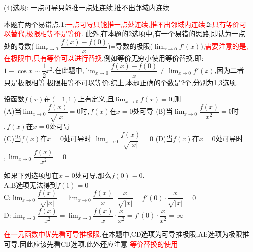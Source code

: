 \documentclass[8pt a4paper, oneside, UTF8]{ctexbook}  %
\begin{document}
\begin{sloppypar}
\begin{solution}
        (4)选项: 一点可导只能推一点处连续,推不出邻域内连续
    \end{solution}
    \begin{note}
        本题有两个易错点,1:\textcolor{red}{一点可导只能推一点处连续,推不出邻域内连续.}2:\textcolor{red}{只有等价可以替代,极限相等不是等价}.\newline
        此外,在本题的2选项中,有一个易错的思路,即认为一点处的导数($\lim_{x\to 0}\dfrac{f(x)-f(0)}{x}$)=导数的极限($\lim_{x\to 0}f'(x)$),\textcolor{red}{需要注意的是,在极限中,只有等价可以进行替换},例如等价无穷小使用等价替换,即:$1-\cos x \sim \dfrac{1}{2}x^2$,在此题中,$\lim_{x\to 0}\dfrac{f(x)-f(0)}{x} \neq \lim_{x\to 0}f'(x)$,因为二者只是极限相等,极限相等不可以等价.综上,本题正确的个数是2个,分别为1,3选项.
    \end{note}
    \begin{problem}
    设函数$f(x)$在$(-1,1)$上有定义,且$\lim_{x\to0}f(x)=0$,则\\
    (A)当$\lim_{x\to 0}\dfrac{f(x)}{\sqrt{|x|}}=0$时$,f(x)$在$x=0$处可导
    (B)当$\lim_{x\to 0}\dfrac{f(x)}{x^{2}}=0$时$,f(x)$在$x=0$处可导\\
    (C)当$f(x)$在$x=0$处可导时$,\lim_{x\to0}\dfrac{f(x)}{\sqrt{|x|}}=0$\quad
    (D)当$f(x)$在$x=0$处可导时$,\lim_{x\to0}\dfrac{f(x)}{x^{2}}=0$
    \end{problem}
    \begin{solution}
        如果下列选项想在$x=0$处可导,那么$f(0)=0$.\\
        A,B选项无法得到$f(0)=0$\\
        C:$\lim_{x\to 0}\dfrac{f(x)}{\sqrt{|x|}}=\lim_{x\to 0} \dfrac{f(x)}{x}\cdot \dfrac{x}{\sqrt{|x|}}=f'(0)\cdot \dfrac{x}{\sqrt{|x|}}=0$\\
        D:$\lim_{x\to 0}\dfrac{f(x)}{x^2}=\lim_{x\to 0} \dfrac{f(x)}{x}\cdot \dfrac{x}{x^2}=f'(0)\cdot \dfrac{x}{x^2}=\infty$
    \end{solution}
    \begin{note}
        \textcolor{red}{在一元函数中优先看可导推极限},在本题中,CD选项为可导推极限,AB选项为极限推可导.因此应该先看CD选项.此外还应注意 \textcolor{red}{等价替换的使用}
    \end{note}

\end{sloppypar}
\end{document}

